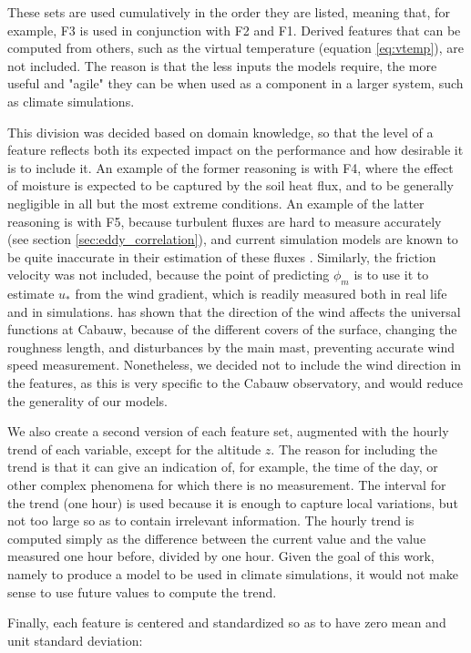 \documentclass[12pt]{book}
\begin{document}
These sets are used cumulatively in the order they are listed, meaning that, for example, F3 is used in conjunction with F2 and F1. Derived features that can be computed from others, such as the virtual temperature (equation \ref{eq:vtemp}), are not included. The reason is that the less inputs the models require, the more useful and "agile" they can be when used as a component in a larger system, such as climate simulations.

This division was decided based on domain knowledge, so that the level of a feature reflects both its expected impact on the performance and how desirable it is to include it. An example of the former reasoning is with F4, where the effect of moisture is expected to be captured by the soil heat flux, and to be generally negligible in all but the most extreme conditions. An example of the latter reasoning is with F5, because turbulent fluxes are hard to measure accurately (see section \ref{sec:eddy_correlation}), and current simulation models are known to be quite inaccurate in their estimation of these fluxes \citep{sheba}. Similarly, the friction velocity was not included, because the point of predicting $\phi_m$ is to use it to estimate $u_*$ from the wind gradient, which is readily measured both in real life and in simulations. \cite{cabauw_z0} has shown that the direction of the wind affects the universal functions at Cabauw, because of the different covers of the surface, changing the roughness length, and disturbances by the main mast, preventing accurate wind speed measurement. Nonetheless, we decided not to include the wind direction in the features, as this is very specific to the Cabauw observatory, and would reduce the generality of our models.

We also create a second version of each feature set, augmented with the hourly trend of each variable, except for the altitude $z$. The reason for including the trend is that it can give an indication of, for example, the time of the day, or other complex phenomena for which there is no measurement. The interval for the trend (one hour) is used because it is enough to capture local variations, but not too large so as to contain irrelevant information. The hourly trend is computed simply as the difference between the current value and the value measured one hour before, divided by one hour. Given the goal of this work, namely to produce a model to be used in climate simulations, it would not make sense to use future values to compute the trend.

Finally, each feature is centered and standardized so as to have zero mean and unit standard deviation:
\end{document}
